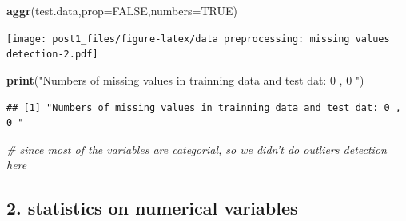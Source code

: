 \documentclass[]{article}
\newenvironment{Shaded}{\begin{snugshade}}{\end{snugshade}}
\newcommand{\KeywordTok}[1]{\textcolor[rgb]{0.13,0.29,0.53}{\textbf{#1}}}
\newcommand{\DataTypeTok}[1]{\textcolor[rgb]{0.13,0.29,0.53}{#1}}
\newcommand{\StringTok}[1]{\textcolor[rgb]{0.31,0.60,0.02}{#1}}
\newcommand{\CommentTok}[1]{\textcolor[rgb]{0.56,0.35,0.01}{\textit{#1}}}
\newcommand{\OtherTok}[1]{\textcolor[rgb]{0.56,0.35,0.01}{#1}}
\newcommand{\NormalTok}[1]{#1}
\begin{document}
\begin{Shaded}
\begin{Highlighting}[]
\KeywordTok{aggr}\NormalTok{(test.data,}\DataTypeTok{prop=}\OtherTok{FALSE}\NormalTok{,}\DataTypeTok{numbers=}\OtherTok{TRUE}\NormalTok{)}
\end{Highlighting}
\end{Shaded}

\texttt{[image: post1\_files/figure-latex/data preprocessing: missing values detection-2.pdf]}

\begin{Shaded}
\begin{Highlighting}[]
\KeywordTok{print}\NormalTok{(}\StringTok{"Numbers of missing values in trainning data and test dat: 0 , 0 "}\NormalTok{)}
\end{Highlighting}
\end{Shaded}

\begin{verbatim}
## [1] "Numbers of missing values in trainning data and test dat: 0 , 0 "
\end{verbatim}

\begin{Shaded}
\begin{Highlighting}[]
\CommentTok{# since most of the variables are categorial, so we didn't do outliers detection here }
\end{Highlighting}
\end{Shaded}

\subsection{2. statistics on numerical
variables}\label{statistics-on-numerical-variables}
\end{document}

